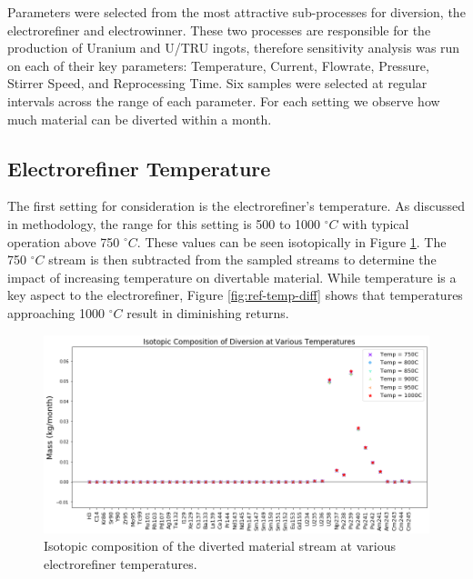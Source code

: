 Parameters were selected from the most attractive
sub-processes for diversion, the electrorefiner and electrowinner. These two processes are responsible for the production of Uranium and U/TRU ingots, therefore sensitivity analysis was run
on each of their key parameters: Temperature, Current, Flowrate, Pressure, Stirrer Speed, and Reprocessing Time. Six samples were selected at regular intervals across the range of each parameter. For each setting we observe how much material can be diverted within a month.
\vspace{-2mm}
\subsection{Electrorefiner Temperature}

The first setting for consideration is the electrorefiner's temperature. As discussed in methodology, the range for this setting is 500 to 1000 $^\circ C$ with typical operation above 750 $^\circ C$. These values can be seen isotopically in Figure \ref{fig:ref-temp-sa}.
The 750 $^\circ C$ stream is then subtracted from the sampled streams to determine the impact of increasing temperature on divertable material.
While temperature is a key aspect to the electrorefiner, Figure \ref{fig:ref-temp-diff} shows that temperatures approaching 1000 $^\circ C$ result in diminishing returns.

\begin{figure}
	\includegraphics[width=\linewidth]{images/temperature-sa-comp}
	\caption{Isotopic composition of the diverted material stream at various electrorefiner temperatures.}
	\label{fig:ref-temp-sa}
\end{figure}

